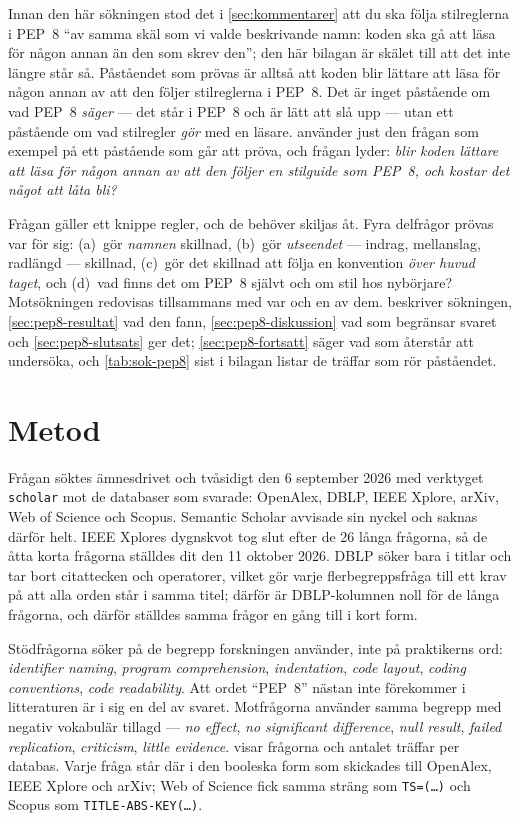 Innan den här sökningen stod det i \cref{sec:kommentarer} att du ska
följa stilreglerna i PEP~8\autocite{pep8} \enquote{av samma skäl som vi
valde beskrivande namn: koden ska gå att läsa för någon annan än den som
skrev den}; den här bilagan är skälet till att det inte längre står så.
Påståendet som prövas är alltså att koden blir lättare att läsa för någon
annan av att den följer stilreglerna i PEP~8.  Det är inget påstående om
vad PEP~8 \emph{säger} --- det står i PEP~8 och är lätt att slå upp ---
utan ett påstående om vad stilregler \emph{gör} med en läsare.
 använder just den frågan som exempel på
ett påstående som går att pröva, och frågan lyder: \emph{blir koden
lättare att läsa för någon annan av att den följer en stilguide som
PEP~8, och kostar det något att låta bli?}

Frågan gäller ett knippe regler, och de behöver skiljas åt.  Fyra
delfrågor prövas var för sig: (a)~gör \emph{namnen} skillnad, (b)~gör
\emph{utseendet} --- indrag, mellanslag, radlängd --- skillnad, (c)~gör
det skillnad att följa en konvention \emph{över huvud taget}, och (d)~vad
finns det om PEP~8 självt och om stil hos nybörjare?  Motsökningen
redovisas tillsammans med var och en av dem.  
beskriver sökningen, \cref{sec:pep8-resultat} vad den fann,
\cref{sec:pep8-diskussion} vad som begränsar svaret och
\cref{sec:pep8-slutsats} ger det; \cref{sec:pep8-fortsatt} säger vad
som återstår att undersöka, och \cref{tab:sok-pep8} sist i bilagan
listar de träffar som rör påståendet.

\section{Metod}
\label{sec:pep8-metod}

Frågan söktes ämnesdrivet och tvåsidigt den 6 september 2026 med
verktyget \texttt{scholar} mot de databaser som svarade: OpenAlex, DBLP,
IEEE Xplore, arXiv, Web of Science och Scopus.  Semantic Scholar avvisade
sin nyckel och saknas därför helt.  IEEE Xplores dygnskvot tog slut efter de
26 långa frågorna, så de åtta korta frågorna ställdes dit den 11 oktober
2026.  DBLP söker bara i titlar och tar bort citattecken och operatorer,
vilket gör varje flerbegreppsfråga till ett krav på att alla orden står i
samma titel; därför är DBLP-kolumnen noll för de långa frågorna, och
därför ställdes samma frågor en gång till i kort form.

Stödfrågorna söker på de begrepp forskningen använder, inte på
praktikerns ord: \emph{identifier naming}, \emph{program comprehension},
\emph{indentation}, \emph{code layout}, \emph{coding conventions},
\emph{code readability}.  Att ordet \enquote{PEP~8} nästan inte
förekommer i litteraturen är i sig en del av svaret.  Motfrågorna
använder samma begrepp med negativ vokabulär tillagd --- \emph{no
effect}, \emph{no significant difference}, \emph{null result},
\emph{failed replication}, \emph{criticism}, \emph{little evidence}.
 visar frågorna och antalet träffar per
databas.  Varje fråga står där i den booleska form som skickades till
OpenAlex, IEEE Xplore och arXiv; Web of Science fick samma sträng som
\texttt{TS=(\dots)} och Scopus som \texttt{TITLE-ABS-KEY(\dots)}.

